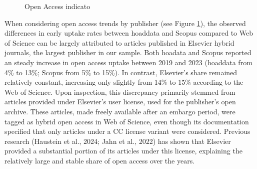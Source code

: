 \documentclass[a4paper,man,floatsintext,longtable,noextraspace,10pt]{apa6}
\begin{document}
\begin{figure}[ht!]


\caption{\label{fig-uptake_publisher}Open Access indicato}

\end{figure}%

When considering open access trends by publisher (see Figure
\ref{fig-uptake_publisher}), the observed differences in early uptake
rates between hoaddata and Scopus compared to Web of Science can be
largely attributed to articles published in Elsevier hybrid journals,
the largest publisher in our sample. Both hoadata and Scopus reported an
steady increase in open access uptake between 2019 and 2023 (hoaddata
from 4\% to 13\%; Scopus from 5\% to 15\%). In contrast, Elsevier's
share remained relatively constant, increasing only slightly from 14\%
to 15\% according to the Web of Science. Upon inspection, this
discrepancy primarily stemmed from articles provided under Elsevier's
user license, used for the publisher's open archive. These articles,
made freely available after an embargo period, were tagged as hybrid
open access in Web of Science, even though its documentation specified
that only articles under a CC license variant were considered. Previous
research (Haustein et al., 2024; Jahn et al., 2022) has shown that
Elsevier provided a substantial portion of its articles under this
license, explaining the relatively large and stable share of open access
over the years.
\end{document}
